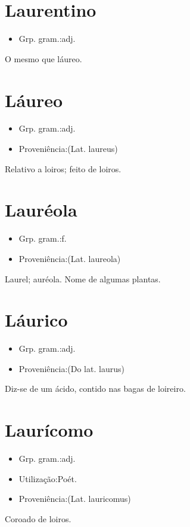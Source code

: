 \section{Laurentino}
\begin{itemize}
\item {Grp. gram.:adj.}
\end{itemize}
O mesmo que \textunderscore láureo\textunderscore .
\section{Láureo}
\begin{itemize}
\item {Grp. gram.:adj.}
\end{itemize}
\begin{itemize}
\item {Proveniência:(Lat. \textunderscore laureus\textunderscore )}
\end{itemize}
Relativo a loiros; feito de loiros.
\section{Lauréola}
\begin{itemize}
\item {Grp. gram.:f.}
\end{itemize}
\begin{itemize}
\item {Proveniência:(Lat. \textunderscore laureola\textunderscore )}
\end{itemize}
Laurel; auréola.
Nome de algumas plantas.
\section{Láurico}
\begin{itemize}
\item {Grp. gram.:adj.}
\end{itemize}
\begin{itemize}
\item {Proveniência:(Do lat. \textunderscore laurus\textunderscore )}
\end{itemize}
Diz-se de um ácido, contido nas bagas de loireiro.
\section{Laurícomo}
\begin{itemize}
\item {Grp. gram.:adj.}
\end{itemize}
\begin{itemize}
\item {Utilização:Poét.}
\end{itemize}
\begin{itemize}
\item {Proveniência:(Lat. \textunderscore lauricomus\textunderscore )}
\end{itemize}
Coroado de loiros.
